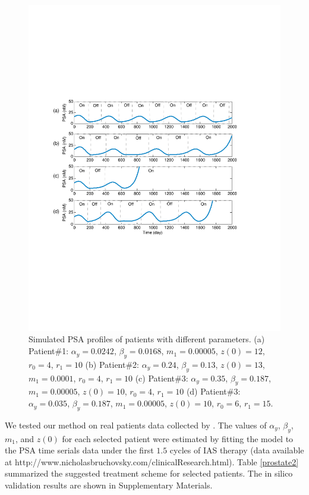 \begin{figure}[htb]
\centering
\includegraphics[scale=0.55]{fig-prostatetraj2}
\caption{Simulated PSA profiles of patients with different parameters. (a) Patient\#1: $\alpha_y=0.0242$, $\beta_y=0.0168$, $m_1=0.00005$, $z(0)=12$, $r_0=4$, $r_1=10$ (b) Patient\#2: $\alpha_y=0.24$, $\beta_y=0.13$, $z(0)=13$, $m_1=0.0001$, $r_0=4$, $r_1=10$ (c) Patient\#3: $\alpha_y=0.35$, $\beta_y=0.187$, $m_1=0.00005$, $z(0)=10$, $r_0=4$, $r_1=10$ (d) Patient\#3: $\alpha_y=0.035$, $\beta_y=0.187$, $m_1=0.00005$, $z(0)=10$, $r_0=6$, $r_1=15$.}
\label{patients}
 \vspace{-0.7cm}
\end{figure}


We tested our method on real patients data collected by \cite{bruchovsky07}. The values of $\alpha_y$, $\beta_y$, $m_1$, and $z(0)$ for each selected patient were estimated by fitting the model to the PSA time serials data under the first $1.5$ cycles of IAS therapy (data available at http://www.nicholasbruchovsky.com/clinicalResearch.html). Table \ref{prostate2} summarized the suggested treatment scheme for selected patients. The in silico validation results are shown in Supplementary Materials.


